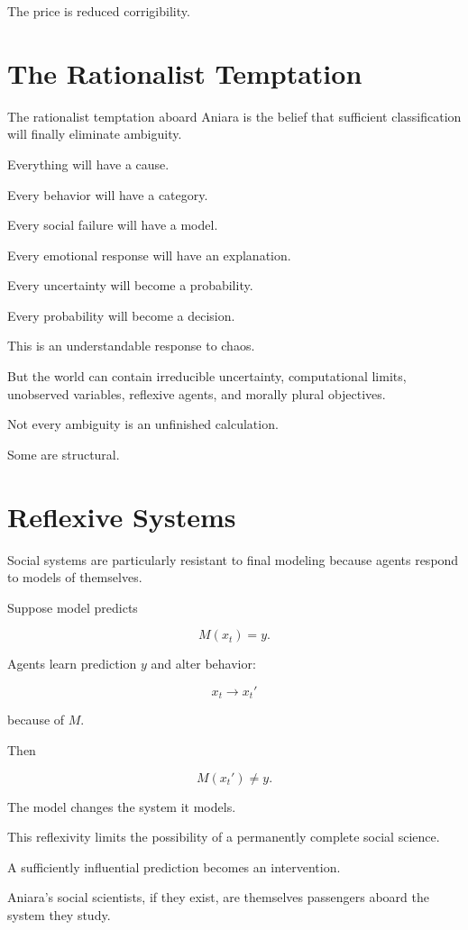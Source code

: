 \documentclass[11pt,oneside]{book}
\theoremstyle{definition}
\theoremstyle{remark}
\begin{document}
The price is reduced corrigibility.

\section{The Rationalist Temptation}

The rationalist temptation aboard Aniara is the belief that sufficient classification will finally eliminate ambiguity.

Everything will have a cause.

Every behavior will have a category.

Every social failure will have a model.

Every emotional response will have an explanation.

Every uncertainty will become a probability.

Every probability will become a decision.

This is an understandable response to chaos.

But the world can contain irreducible uncertainty, computational limits, unobserved variables, reflexive agents, and morally plural objectives.

Not every ambiguity is an unfinished calculation.

Some are structural.

\section{Reflexive Systems}

Social systems are particularly resistant to final modeling because agents respond to models of themselves.

Suppose model predicts

\[
M(x_t)=y.
\]

Agents learn prediction \(y\) and alter behavior:

\[
x_t\rightarrow x_t'
\]

because of \(M\).

Then

\[
M(x_t')
\neq y.
\]

The model changes the system it models.

This reflexivity limits the possibility of a permanently complete social science.

A sufficiently influential prediction becomes an intervention.

Aniara's social scientists, if they exist, are themselves passengers aboard the system they study.
\end{document}
